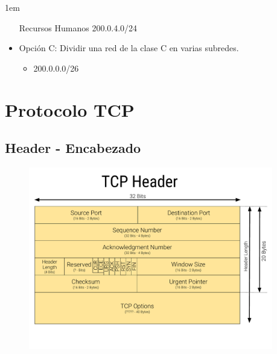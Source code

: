 \documentclass[12pt, fleqn]{report}                             %
\newenvironment{SmallIndentation}[1][0.75em]                    %
        {\begin{adjustwidth}{#1}{}\begin{footnotesize}}             %
        {\end{footnotesize}\end{adjustwidth}}                       %
\theoremstyle{break}                                            %
\newcommand{\Color}[2]{\textcolor{#1}{#2}}                      %
\begin{document}
\begin{SmallIndentation}[1em]
\begin{itemize}
                        Recursos Humanos \Color{Blue700MD}{200.0.4.0/24}

                    \item 
                        Opción C: Dividir una red de la clase C en varias subredes.

                        \begin{itemize}
                            \item \Color{Blue700MD}{200.0.0.0/26}
                        \end{itemize}

                \end{itemize}

            
            \end{SmallIndentation}
                


    \clearpage
    \chapter{Protocolo TCP}



        \clearpage
        \section{Header - Encabezado}

            \begin{figure}[h]
                \centering
                \includegraphics[width=0.95\textwidth]{TCP-Header}
            \end{figure}
\end{document}
